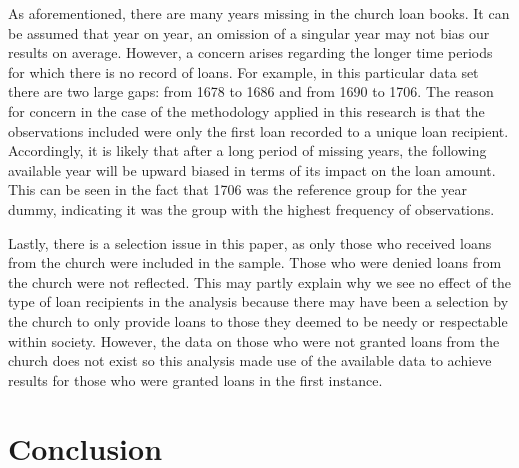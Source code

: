 \documentclass[11pt,preprint, authoryear]{elsarticle}
\numberwithin{equation}{section}
\numberwithin{figure}{section}
\numberwithin{table}{section}
\begin{document}
As aforementioned, there are many years missing in the church loan
books. It can be assumed that year on year, an omission of a singular
year may not bias our results on average. However, a concern arises
regarding the longer time periods for which there is no record of loans.
For example, in this particular data set there are two large gaps: from
1678 to 1686 and from 1690 to 1706. The reason for concern in the case
of the methodology applied in this research is that the observations
included were only the first loan recorded to a unique loan recipient.
Accordingly, it is likely that after a long period of missing years, the
following available year will be upward biased in terms of its impact on
the loan amount. This can be seen in the fact that 1706 was the
reference group for the year dummy, indicating it was the group with the
highest frequency of observations.

Lastly, there is a selection issue in this paper, as only those who
received loans from the church were included in the sample. Those who
were denied loans from the church were not reflected. This may partly
explain why we see no effect of the type of loan recipients in the
analysis because there may have been a selection by the church to only
provide loans to those they deemed to be needy or respectable within
society. However, the data on those who were not granted loans from the
church does not exist so this analysis made use of the available data to
achieve results for those who were granted loans in the first instance.

\newpage

\hypertarget{conclusion}{%
\section{\texorpdfstring{Conclusion
\label{Conclusion}}{Conclusion }}\label{conclusion}}
\end{document}
